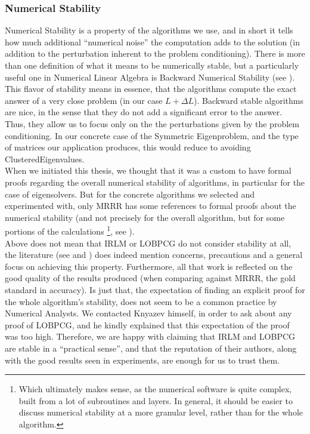 \subsubsection{Numerical Stability}

Numerical Stability is a property of the algorithms we use, and in
short it tells how much additional ``numerical noise'' the computation
adds to the solution (in addition to the perturbation inherent to the
problem conditioning). There is more than one definition of what it
means to be numerically stable, but a particularly useful one in Numerical
Linear Algebra is Backward Numerical Stability (see \cite{bindel09}). This
flavor of stability means
in essence, that the algorithms compute the exact answer of a very
close problem (in our case $L + \Delta L$). Backward stable algorithms are 
nice, in the sense that they do not add a significant error to the
answer. Thus, they allow us to focus only on the
the perturbations given by the problem conditioning. In our concrete
case of the Symmetric Eigenproblem, and the type of matrices our
application produces, this would reduce to avoiding
\gls{ClusteredEigenvalues}. \\

When we initiated this thesis, we thought that it was a custom to have
formal proofs regarding the overall numerical stability of algorithms,
in particular for the case  of eigensolvers. But for the concrete
algorithms we selected and experimented with, only \gls{MRRR} has some
references to formal proofs about the numerical stability (and not
precisely for the overall algorithm, but for some portions of the
calculations \footnote{Which ultimately makes sense, as the numerical
software is quite complex, built from a lot of subroutines and
layers. In general, it should be easier to discuss numerical stability
at a more granular level, rather than for the whole algorithm.}, see
\cite{dhillon06}). \\   

Above does not mean that \gls{IRLM} or \gls{LOBPCG} do not consider
stability at all, the literature (see \cite{arpack} and
\cite{knyazev01}) does indeed mention concerns, precautions and 
a general focus on achieving this property. Furthermore, all that
work is reflected on the good quality of the results produced (when
comparing against \gls{MRRR}, the gold standard in accuracy). Is just
that, the expectation of finding an explicit proof for the whole
algorithm's stability, does not seem to be a
common practice by Numerical Analysts. We contacted Knyazev
himself, in order to ask about any proof of \gls{LOBPCG}, and he
kindly explained that this expectation of the proof was too
high. Therefore, we are happy with claiming that
\gls{IRLM} and \gls{LOBPCG} are stable in a ``practical sense'',
and that the reputation of their authors, along with the good results
seen in experiments, are enough for us to trust them.

